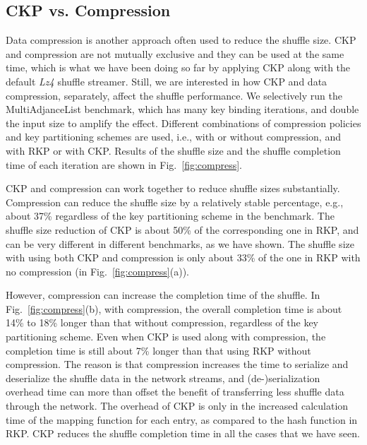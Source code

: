 \documentclass[10pt,journal,compsoc]{IEEEtran}
\begin{document}
\subsection{CKP vs. Compression}
Data compression is another approach often used to reduce the shuffle
size. CKP and compression are not mutually exclusive and they can be
used at the same time, which is what we have been doing so far by
applying CKP along with the default \emph{Lz4} shuffle streamer. Still, we are
interested in how CKP and data compression, separately, affect the
shuffle performance. We selectively run the MultiAdjanceList benchmark,
which has many key binding iterations, and double the input size to
amplify the effect. Different combinations of compression policies and
key partitioning schemes are used, i.e., with or without compression,
and with RKP or with CKP. Results of the shuffle size and the shuffle
completion time of each iteration are shown in Fig.~\ref{fig:compress}.

CKP and compression can work together to reduce shuffle sizes
substantially.
Compression can reduce the shuffle size by a
relatively stable percentage, e.g., about 37\% regardless of the key
partitioning scheme in the benchmark.
The shuffle size reduction of CKP is about 50\% of the corresponding one
in RKP, and can be very different in different benchmarks, as we have
shown. The shuffle size with using both CKP and compression is only
about 33\% of the one in RKP with no compression (in
Fig.~\ref{fig:compress}(a)).  

However, compression can increase the completion time of the shuffle.
In Fig.~\ref{fig:compress}(b), with compression, the overall completion
time is about 14\% to 18\% longer than that without compression,
regardless of the key partitioning scheme. Even when CKP is used along
with compression, the completion time is still about 7\% longer than
that using RKP without compression. The reason is that compression
increases the time to serialize and deserialize the shuffle data in the network
streams, and (de-)serialization overhead time can more than offset the benefit
of transferring less shuffle data through the network. The overhead of
CKP is only in the increased calculation time of the mapping function for
each entry, as compared to the hash function in RKP. CKP reduces the
shuffle completion time in all the cases that we have seen.
\end{document}
